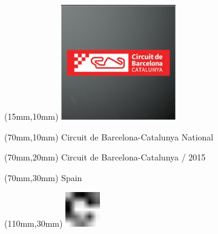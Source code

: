 \null\newpage
\begin{textblock*}{50mm}(15mm,10mm)%
\includegraphics[width=50mm]{LG/2015-05-20_00078.png}
\end{textblock*}
\begin{textblock*}{130mm}(70mm,10mm)%
{\fontsize{20}{20}\selectfont Circuit de Barcelona-Catalunya National}\\
\end{textblock*}
\begin{textblock*}{120mm}(70mm,20mm)%
{\fontsize{16}{16}\selectfont Circuit de Barcelona-Catalunya / 2015}\\
\end{textblock*}
\begin{textblock*}{120mm}(70mm,30mm)%
{\fontsize{12}{12}\selectfont Spain}
\end{textblock*}
\begin{textblock*}{30mm}(110mm,30mm)%
\centering
\includegraphics[height=15mm]{icons/fa-rotate-right.pdf}
\end{textblock*}
